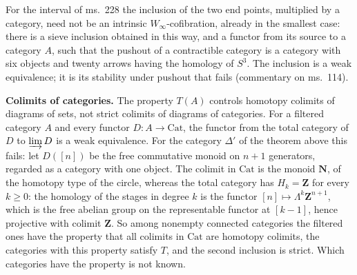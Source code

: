 For the interval of ms.~228 the inclusion of the two end points, multiplied by a category, need not be an intrinsic $W_\infty$-cofibration, already in the smallest case: there is a sieve inclusion obtained in this way, and a functor from its source to a category $A$, such that the pushout of a contractible category is a category with six objects and twenty arrows having the homology of $S^3$. The inclusion is a weak equivalence; it is its stability under pushout that fails (commentary on ms.~114).

\textbf{Colimits of categories.}
The property $T(A)$ controls homotopy colimits of diagrams of sets, not strict colimits of diagrams of categories. For a filtered category $A$ and every functor $D:A\to\mathrm{Cat}$, the functor from the total category of $D$ to $\varinjlim D$ is a weak equivalence. For the category $\Delta'$ of the theorem above this fails: let $D([n])$ be the free commutative monoid on $n+1$ generators, regarded as a category with one object. The colimit in $\mathrm{Cat}$ is the monoid $\mathbf N$, of the homotopy type of the circle, whereas the total category has $H_k=\mathbf Z$ for every $k\geq0$: the homology of the stages in degree $k$ is the functor $[n]\mapsto\Lambda^k\mathbf Z^{n+1}$, which is the free abelian group on the representable functor at $[k-1]$, hence projective with colimit $\mathbf Z$. So among nonempty connected categories the filtered ones have the property that all colimits in $\mathrm{Cat}$ are homotopy colimits, the categories with this property satisfy $T$, and the second inclusion is strict. Which categories have the property is not known.
